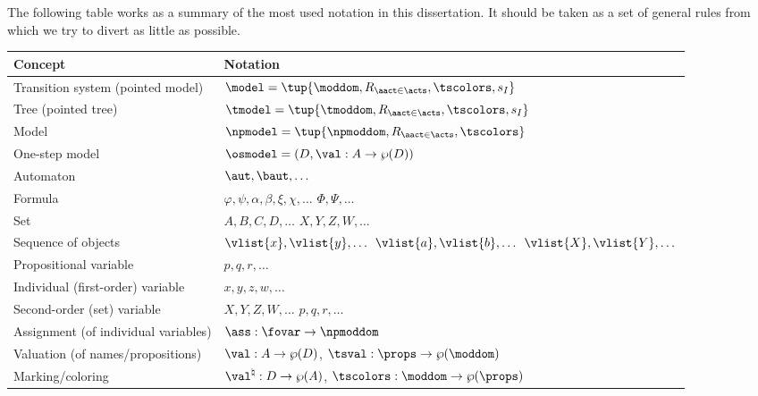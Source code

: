 
The following table works as a summary of the most used notation in this dissertation. It should be taken as a set of general rules from which we try to divert as little as possible.

\begin{center}
\begin{tabular}{|l|l|}
	\hline
	\textbf{Concept} & \textbf{Notation}\\
	\hline
	\hline
	Transition system (pointed model) & $\model = \tup{\moddom,R_{\aact\in\acts},\tscolors,s_I}$\\
	Tree (pointed tree) & $\tmodel = \tup{\tmoddom,R_{\aact\in\acts},\tscolors,s_I}$\\
	Model & $\npmodel = \tup{\npmoddom,R_{\aact\in\acts},\tscolors}$\\
	One-step model & $\osmodel = (D,\val:A\to\wp(D))$\\
	Automaton & $\aut,\baut,\dots$\\
	\hline
	\hline
	Formula & $\varphi, \psi, \alpha, \beta, \xi, \chi,\dots$ $\Phi,\Psi,\dots$\\
	Set & $A, B, C, D,\dots$ $X, Y, Z, W,\dots$\\
	Sequence of objects & $\vlist{x}, \vlist{y}, \dots$ $\vlist{a}, \vlist{b}, \dots$ $\vlist{X}, \vlist{Y}, \dots$\\
	Propositional variable & $p, q, r, \dots$\\
	Individual (first-order) variable & $x, y, z, w, \dots$\\
	Second-order (set) variable & $X,Y,Z,W,\dots$ $p,q,r,\dots$\\
	\hline
	\hline
	Assignment (of individual variables) & $\ass:\fovar \to \npmoddom$\\
	Valuation (of names/propositions) & $\val:A\to \wp(D)$, $\tsval:\props\to\wp(\moddom)$\\
	Marking/coloring & $\val^\natural:D\to \wp(A)$, $\tscolors:\moddom\to\wp(\props)$\\
	\hline
\end{tabular}
\end{center}
